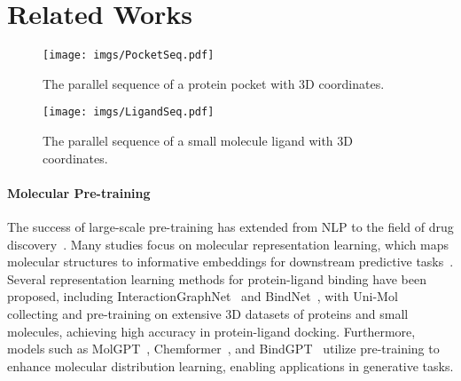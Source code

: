 \section{Related Works}
\begin{figure}[t]
    \centering
    \texttt{[image: imgs/PocketSeq.pdf]}
    \vspace{-0.5cm}
    \caption{The parallel sequence of a protein pocket with 3D coordinates.}
    \label{PocketSeq}
    \vspace{-0.2cm}
\end{figure}
\begin{figure}[t]
    \centering
    \texttt{[image: imgs/LigandSeq.pdf]}
    \vspace{-0.5cm}
    \caption{The parallel sequence of a small molecule ligand with 3D coordinates.}
    \label{LigandSeq}
    \vspace{-0.2cm}
\end{figure}

\paragraph{Molecular Pre-training}
The success of large-scale pre-training has extended from NLP to the field of drug discovery~\citep{ChemPretrainingSurvey, chen2023structure}. Many studies focus on molecular representation learning, which maps molecular structures to informative embeddings for downstream predictive tasks~\cite{PhysChem,GEM,DrugClip}. Several representation learning methods for protein-ligand binding have been proposed, including InteractionGraphNet~\citep{InteractionGraphNet} and BindNet~\citep{BindNet}, with Uni-Mol~\citep{Uni-Mol} collecting and pre-training on extensive 3D datasets of proteins and small molecules, achieving high accuracy in protein-ligand docking. Furthermore, models such as MolGPT~\citep{MolGPT}, Chemformer~\citep{Chemformer}, and BindGPT~\citep{BindGPT} utilize pre-training to enhance molecular distribution learning, enabling applications in generative tasks.

